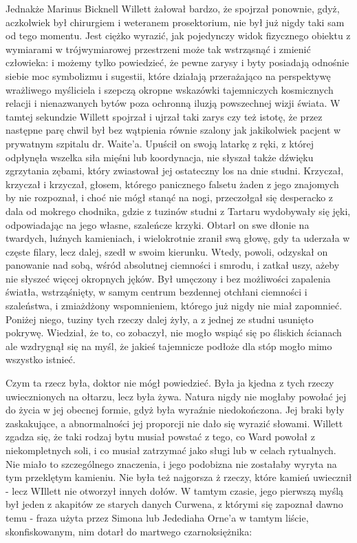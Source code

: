 Jednakże Marinus Bicknell Willett żałował bardzo, że spojrzał ponownie, gdyż, aczkolwiek był chirurgiem i weteranem prosektorium, nie był już nigdy taki sam od tego momentu. Jest ciężko wyrazić, jak pojedynczy widok fizycznego obiektu z wymiarami w trójwymiarowej przestrzeni może tak wstrząsnąć i zmienić człowieka: i możemy tylko powiedzieć, że pewne zarysy i byty posiadają odnośnie siebie moc symbolizmu i sugestii, które działają przerażająco na perspektywę wrażliwego myśliciela i szepczą okropne wskazówki tajemniczych kosmicznych relacji i nienazwanych bytów poza ochronną iluzją powszechnej wizji świata. W tamtej sekundzie Willett spojrzał i ujrzał taki zarys czy też istotę, że przez następne parę chwil był bez wątpienia równie szalony jak jakikolwiek pacjent w prywatnym szpitalu dr. Waite'a. Upuścił on swoją latarkę z ręki, z której odpłynęła wszelka siła mięśni lub koordynacja, nie słyszał także dźwięku zgrzytania zębami, który zwiastował jej ostateczny los na dnie studni. Krzyczał, krzyczał i krzyczał, głosem, którego panicznego falsetu żaden z jego znajomych by nie rozpoznał, i choć nie mógł stanąć na nogi, przeczołgał się desperacko z dala od mokrego chodnika, gdzie z tuzinów studni z Tartaru wydobywały się jęki, odpowiadając na jego własne, szaleńcze krzyki. Obtarł on swe dłonie na twardych, luźnych kamieniach, i wielokrotnie zranił swą głowę, gdy ta uderzała w częste filary, lecz dalej, szedł w swoim kierunku. Wtedy, powoli, odzyskał on panowanie nad sobą, wśród absolutnej ciemności i smrodu, i zatkał uszy, ażeby nie słyszeć więcej okropnych jęków. Był umęczony i bez możliwości zapalenia światła, wstrząśnięty, w samym centrum bezdennej otchłani ciemności i szaleństwa, i zmiażdżony wspomnieniem, którego już nigdy nie miał zapomnieć. Poniżej niego, tuziny tych rzeczy dalej żyły, a z jednej ze studni usunięto pokrywę. Wiedział, że to, co zobaczył, nie mogło wspiąć się po śliskich ścianach ale wzdrygnął się na myśl, że jakieś tajemnicze podłoże dla stóp mogło mimo wszystko istnieć. 

Czym ta rzecz była, doktor nie mógł powiedzieć. Była ja kjedna z tych rzeczy uwiecznionych na ołtarzu, lecz była żywa. Natura nigdy nie mogłaby powołać jej do życia w jej obecnej formie, gdyż była wyraźnie niedokończona. Jej braki były zaskakujące, a abnormalności jej proporcji nie dało się wyrazić słowami. Willett zgadza się, że taki rodzaj bytu musiał powstać z tego, co Ward powołał z niekompletnych soli, i co musiał zatrzymać jako sługi lub w celach rytualnych. Nie miało to szczególnego znaczenia, i jego podobizna nie zostałaby wyryta na tym przeklętym kamieniu. Nie była też najgorsza ż rzeczy, które kamień uwiecznił - lecz WIllett nie otworzył innych dołów. W tamtym czasie, jego pierwszą myślą był jeden z akapitów ze starych danych Curwena, z którymi się zapoznał dawno temu - fraza użyta przez Simona lub Jedediaha Orne'a w tamtym liście, skonfiskowanym, nim dotarł do martwego czarnoksiężnika:  

